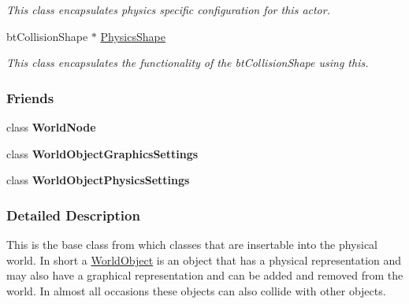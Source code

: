 \begin{DoxyCompactItemize}
\begin{DoxyCompactList}\small\item\em This class encapsulates physics specific configuration for this actor. \item\end{DoxyCompactList}\item 
\hypertarget{classMezzanine_1_1WorldObject_a82cf249f457edb1e3786c1d716961e0e}{
btCollisionShape $\ast$ \hyperlink{classMezzanine_1_1WorldObject_a82cf249f457edb1e3786c1d716961e0e}{PhysicsShape}}
\label{classMezzanine_1_1WorldObject_a82cf249f457edb1e3786c1d716961e0e}

\begin{DoxyCompactList}\small\item\em This class encapsulates the functionality of the btCollisionShape using this. \item\end{DoxyCompactList}\end{DoxyCompactItemize}
\subsubsection*{Friends}
\begin{DoxyCompactItemize}
\item 
\hypertarget{classMezzanine_1_1WorldObject_a1cacd07efb11226da49a7c80569b18e8}{
class {\bfseries WorldNode}}
\label{classMezzanine_1_1WorldObject_a1cacd07efb11226da49a7c80569b18e8}

\item 
\hypertarget{classMezzanine_1_1WorldObject_ad45d2e498e36f986473547343e4b149e}{
class {\bfseries WorldObjectGraphicsSettings}}
\label{classMezzanine_1_1WorldObject_ad45d2e498e36f986473547343e4b149e}

\item 
\hypertarget{classMezzanine_1_1WorldObject_a5e0ab16f1e7b0d4d1c848b974f5d4662}{
class {\bfseries WorldObjectPhysicsSettings}}
\label{classMezzanine_1_1WorldObject_a5e0ab16f1e7b0d4d1c848b974f5d4662}

\end{DoxyCompactItemize}


\subsubsection{Detailed Description}
This is the base class from which classes that are insertable into the physical world. In short a \hyperlink{classMezzanine_1_1WorldObject}{WorldObject} is an object that has a physical representation and may also have a graphical representation and can be added and removed from the world. In almost all occasions these objects can also collide with other objects. 

